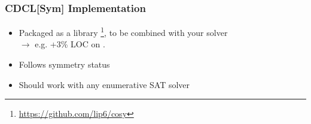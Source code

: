 \documentclass{beamer}
\begin{document}
\begin{frame}
\frametitle{CDCL[Sym] Implementation}
\begin{itemize}
	\item Packaged as a library \textbf{\libdsb}\footnote{\url{https://github.com/lip6/cosy}}, to be combined with your solver\\{\color{blue}\hfill$\rightarrow$ e.g. +3\% LOC on \minisat}.
	
	\item Follows symmetry status
	
	\item Should work with any enumerative SAT solver

\end{itemize}

\end{frame}
\end{document}
